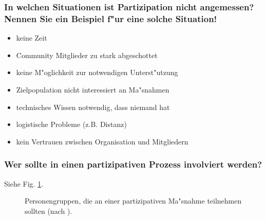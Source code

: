 \subsubsection{In welchen Situationen ist Partizipation nicht angemessen? Nennen Sie ein Beispiel f"ur eine solche Situation!}
\begin{itemize}
        \item keine Zeit
        \item Community Mitglieder zu stark abgeschottet
        \item keine M"oglichkeit zur notwendigen Unterst"utzung
        \item Zielpopulation nicht interessiert an Ma"snahmen
        \item technisches Wissen notwendig, dass niemand hat
        \item logistische Probleme (z.B. Distanz)
        \item kein Vertrauen zwischen Organisation und Mitgliedern
\end{itemize}

\subsubsection{Wer sollte in einen partizipativen Prozess involviert werden?}
Siehe Fig. \ref{fig:rabinowitz1}.

\begin{figure}[hb!]
        \begin{center}
        \end{center}
        \caption{Personengruppen, die an einer partizipativen Ma"snahme teilnehmen sollten (nach \textcite{rabinowitz_section_2013}).}
        \label{fig:rabinowitz1}
\end{figure}

